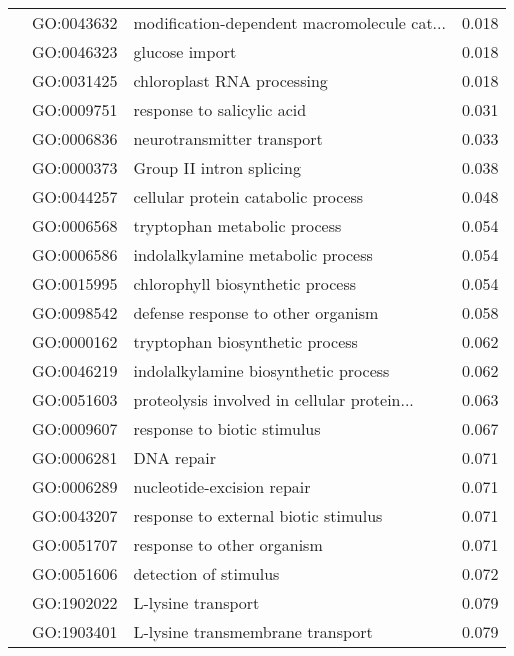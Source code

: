 \begin{longtable}{lllr}
   & GO:0043632 &  modification-dependent macromolecule cat... &         0.018 \\
   & GO:0046323 &                               glucose import &         0.018 \\
   & GO:0031425 &                   chloroplast RNA processing &         0.018 \\
   & GO:0009751 &                   response to salicylic acid &         0.031 \\
   & GO:0006836 &                   neurotransmitter transport &         0.033 \\
   & GO:0000373 &                     Group II intron splicing &         0.038 \\
   & GO:0044257 &           cellular protein catabolic process &         0.048 \\
   & GO:0006568 &                 tryptophan metabolic process &         0.054 \\
   & GO:0006586 &            indolalkylamine metabolic process &         0.054 \\
   & GO:0015995 &             chlorophyll biosynthetic process &         0.054 \\
   & GO:0098542 &           defense response to other organism &         0.058 \\
   & GO:0000162 &              tryptophan biosynthetic process &         0.062 \\
   & GO:0046219 &         indolalkylamine biosynthetic process &         0.062 \\
   & GO:0051603 &  proteolysis involved in cellular protein... &         0.063 \\
   & GO:0009607 &                  response to biotic stimulus &         0.067 \\
   & GO:0006281 &                                   DNA repair &         0.071 \\
   & GO:0006289 &                   nucleotide-excision repair &         0.071 \\
   & GO:0043207 &         response to external biotic stimulus &         0.071 \\
   & GO:0051707 &                   response to other organism &         0.071 \\
   & GO:0051606 &                        detection of stimulus &         0.072 \\
   & GO:1902022 &                           L-lysine transport &         0.079 \\
   & GO:1903401 &             L-lysine transmembrane transport &         0.079 \\

\end{longtable}
